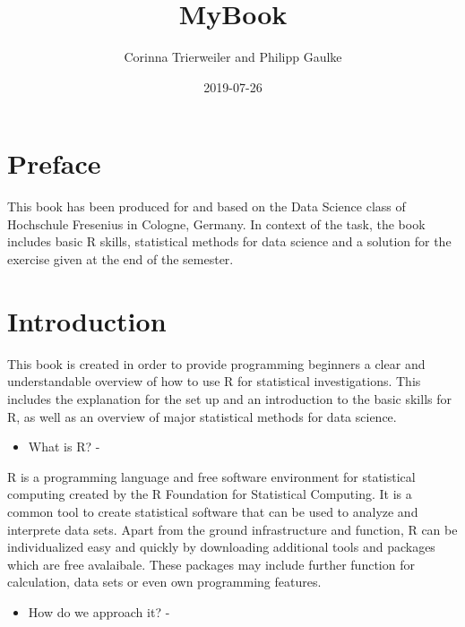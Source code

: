 \documentclass[]{report}
\title{MyBook}
\author{Corinna Trierweiler and Philipp Gaulke}
\date{2019-07-26}
\providecommand{\tightlist}{%
  \setlength{\itemsep}{0pt}\setlength{\parskip}{0pt}}
\begin{document}
\maketitle

{
\setcounter{tocdepth}{1}
\tableofcontents
}
\chapter*{Preface}\label{preface}

This book has been produced for and based on the Data Science class of
Hochschule Fresenius in Cologne, Germany. In context of the task, the
book includes basic R skills, statistical methods for data science and a
solution for the exercise given at the end of the semester.

\chapter*{Introduction}\label{introduction}

This book is created in order to provide programming beginners a clear
and understandable overview of how to use R for statistical
investigations. This includes the explanation for the set up and an
introduction to the basic skills for R, as well as an overview of major
statistical methods for data science.

\begin{itemize}
\tightlist
\item
  What is R? -
\end{itemize}

R is a programming language and free software environment for
statistical computing created by the R Foundation for Statistical
Computing. It is a common tool to create statistical software that can
be used to analyze and interprete data sets. Apart from the ground
infrastructure and function, R can be individualized easy and quickly by
downloading additional tools and packages which are free avalaibale.
These packages may include further function for calculation, data sets
or even own programming features.

\begin{itemize}
\tightlist
\item
  How do we approach it? -
\end{itemize}
\end{document}
